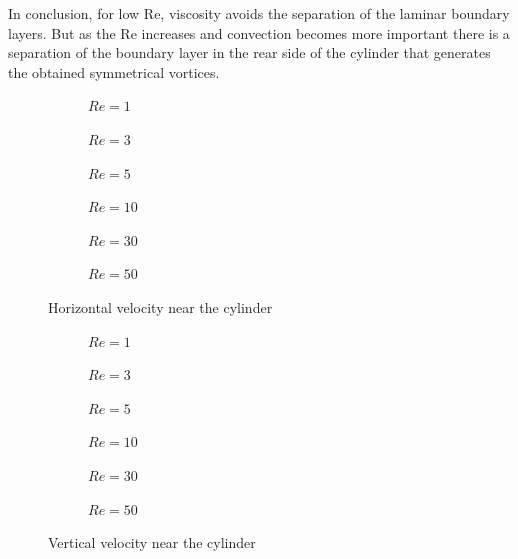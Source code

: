 In conclusion, for low Re, viscosity avoids the separation of the laminar boundary layers. But as the Re increases and convection becomes more important there is a separation of the boundary layer in the rear side of the cylinder that generates the obtained symmetrical vortices.

\begin{figure}[h!]
	\centering
	\begin{subfigure}{0.5\textwidth}
		\resizebox{1.1\textwidth}{!}{}
		\caption{$Re=1$}
	\end{subfigure}%
	\begin{subfigure}{0.5\textwidth}
		\resizebox{1.1\textwidth}{!}{}
		\caption{$Re=3$}
	\end{subfigure}
	\begin{subfigure}{0.5\textwidth}
		\resizebox{1.1\textwidth}{!}{}
		\caption{$Re=5$}
	\end{subfigure}%
	\begin{subfigure}{0.5\textwidth}
		\resizebox{1.1\textwidth}{!}{}
		\caption{$Re=10$}
	\end{subfigure}
	\begin{subfigure}{0.5\textwidth}
		\resizebox{1.1\textwidth}{!}{}
		\caption{$Re=30$}
	\end{subfigure}%
	\begin{subfigure}{0.5\textwidth}
		\resizebox{1.1\textwidth}{!}{}
		\caption{$Re=50$}
	\end{subfigure}
\caption{Horizontal velocity near the cylinder}
\label{HorizontalCylinder}
\end{figure}

\begin{figure}[H]
	\centering
	\begin{subfigure}{0.5\textwidth}
		\resizebox{1.1\textwidth}{!}{}
		\caption{$Re=1$}
	\end{subfigure}%
	\begin{subfigure}{0.5\textwidth}
		\resizebox{1.1\textwidth}{!}{}
		\caption{$Re=3$}
	\end{subfigure}
	\begin{subfigure}{0.5\textwidth}
		\resizebox{1.1\textwidth}{!}{}
		\caption{$Re=5$}
	\end{subfigure}%
	\begin{subfigure}{0.5\textwidth}
		\resizebox{1.1\textwidth}{!}{}
		\caption{$Re=10$}
	\end{subfigure}
	\begin{subfigure}{0.5\textwidth}
		\resizebox{1.1\textwidth}{!}{}
		\caption{$Re=30$}
	\end{subfigure}%
	\begin{subfigure}{0.5\textwidth}
		\resizebox{1.1\textwidth}{!}{}
		\caption{$Re=50$}
	\end{subfigure}
	\caption{Vertical velocity near the cylinder}
	\label{VerticalCylinder}
\end{figure}

